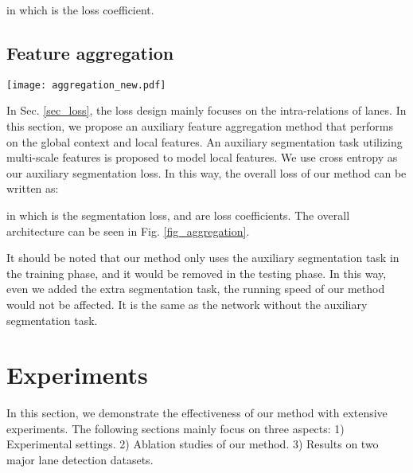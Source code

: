 \documentclass[runningheads]{llncs}
\begin{document}
in which  is the loss coefficient.
\subsection{Feature aggregation}
\begin{figure*}[t]
	\centering
	\texttt{[image: aggregation\_new.pdf]}
	\caption{Overall architecture. The auxiliary branch is shown in the upper part, which is only valid when training. The feature extractor is shown in the blue box. The classification-based prediction and auxiliary segmentation task are illustrated in the green and orange boxes, respectively. The group classification is conducted on each row anchor.}
	\label{fig_aggregation}
	\vspace{-10pt}
\end{figure*}

In Sec. \ref{sec_loss}, the loss design mainly focuses on the intra-relations of lanes. In this section, we propose an auxiliary feature aggregation method that performs on the global context and local features. An auxiliary segmentation task utilizing multi-scale features is proposed to model local features. We use cross entropy as our auxiliary segmentation loss. In this way, the overall loss of our method can be written as:

in which  is the segmentation loss,  and  are loss coefficients.
The overall architecture can be seen in Fig. \ref{fig_aggregation}. 



It should be noted that our method only uses the auxiliary segmentation task in the training phase, and it would be removed in the testing phase. In this way, even we added the extra segmentation task, the running speed of our method would not be affected. It is the same as the network without the auxiliary segmentation task.



\section{Experiments}

In this section, we demonstrate the effectiveness of our method with extensive experiments. The following sections mainly focus on three aspects: 1) Experimental settings. 2) Ablation studies of our method. 3) Results on two major lane detection datasets. 

\begin{table*}[]
	\centering
	\caption{Datasets description}
	\label{tab:dataset}
	\vspace{-10pt}
\end{table*}
\end{document}
